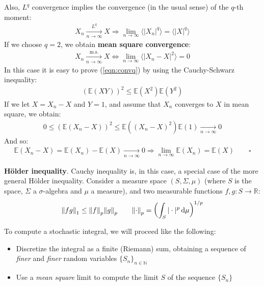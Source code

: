 \documentclass[../template.tex]{subfiles}
\begin{document}
\begin{itemize}
    Also, $L^q$ convergence implies the convergence (in the usual sense) of the $q$-th moment:
    \begin{align}
        X_n  \xrightarrow[n \to \infty]{L^q} X \Rightarrow \lim_{n \to\infty } \langle |X_n|^q \rangle = \langle |X|^q \rangle
        \label{eqn:convq}
    \end{align}
    If we choose $q=2$, we obtain \textbf{mean square convergence}:
    \begin{align*}
        X_n  \xrightarrow[n \to \infty]{\mathrm{m.s.}} X \Leftrightarrow \lim_{n \to\infty } \langle |X_n - X|^2 \rangle = 0
    \end{align*} 
    In this case it is easy to prove (\ref{eqn:convq}) by using the Cauchy-Schwarz inequality:
    \begin{align*}
        (\mathbb{E}(XY))^2 \leq \mathbb{E}(X^2) \mathbb{E}(Y^2)
    \end{align*}
    If we let $X = X_n - X$ and $Y = 1$, and assume that $X_n$ converges to $X$ in mean square, we obtain:
    \begin{align*}
        0 \leq (\mathbb{E}(X_n - X))^2 \leq \mathbb{E}((X_n - X)^2) \mathbb{E}(1) \xrightarrow[n \to \infty]{} 0
    \end{align*}
    And so:
    \begin{align*}
        \mathbb{E}(X_n - X) = \mathbb{E}(X_n) - \mathbb{E}(X) \xrightarrow[n \to \infty]{}  0 \Rightarrow \lim_{n \to \infty} \mathbb{E}(X_n) = \mathbb{E}(X) \qquad \square
    \end{align*}
    \begin{expl}
        \textbf{H\"older inequality}. Cauchy inequality is, in this case, a special case of the more general H\"older inequality. Consider a measure space $(S,\Sigma,\mu)$ (where $S$ is the space, $\Sigma$ a $\sigma$-algebra and $\mu$ a measure), and two measurable functions $f,g\colon S \to \mathbb{R}$:
        \begin{align*}
            \norm{f g}_1 \leq \norm{f}_p \norm{g}_p \qquad \norm{\cdot}_p = \left(\int_S |\cdot|^p \dd{\mu}\right)^{1/p}
        \end{align*}  
    \end{expl}
\end{itemize}
To compute a stochastic integral, we will proceed like the following:
\begin{itemize}
    \item Discretize the integral as a finite (Riemann) sum, obtaining a sequence of \textit{finer} and \textit{finer} random variables $\{S_n\}_{n \in \mathbb{N}}$  
    \item Use a \textit{mean square} limit to compute the limit $S$ of the sequence $\{S_n\}$
\end{itemize}
\end{document}
